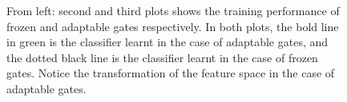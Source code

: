 \begin{figure}[h]
\caption{From left: second and third plots shows the training performance of frozen and adaptable gates respectively. In both plots, the bold line in green is the classifier learnt in the case of adaptable gates, and the dotted black line is the classifier learnt in the case of frozen gates. Notice the transformation of the feature space in the case of adaptable gates.}
\label{fig:feat}
\end{figure}
